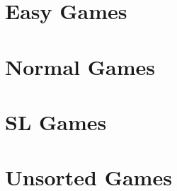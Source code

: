 \documentclass[a4paper]{article}
\title{\myasignname}
\begin{document}
\section{Easy Games}

\begin{shortque*}{}
    
\end{shortque*}

\section{Normal Games}

\begin{shortque*}{}
    
\end{shortque*}

\section{SL Games}

\begin{shortque*}{}
    
\end{shortque*}

\section{Unsorted Games}

\begin{shortque*}{}
    
\end{shortque*}
\end{document}
